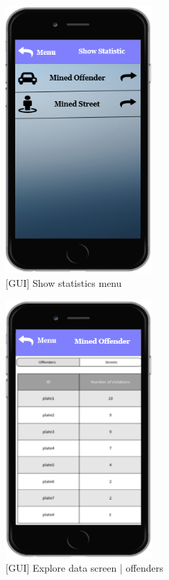 \begin{figure}[h]
		\centering
      \includegraphics[width=0.5\textwidth]{GUI/ShowStatistic.png}
      \caption{[GUI] Show statistics menu}   \label{fig:ShowStatistic}
\end{figure}

\begin{figure}[h]
		\centering
      \includegraphics[width=0.5\textwidth]{GUI/MinedOffender.png}
      \caption{[GUI] Explore data screen | offenders}   \label{fig:MinedOffender}
\end{figure}

